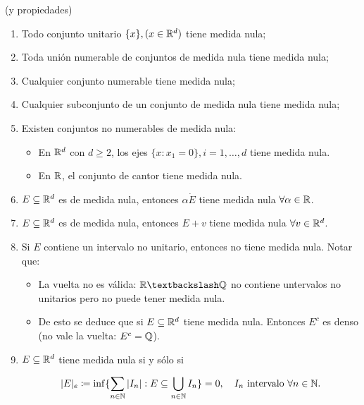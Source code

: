 	\begin{eg}
		(y propiedades)
		\begin{enumerate}
			\item Todo conjunto unitario $\{x\}, (x\in\mathbb{R}^d)$ tiene medida nula;

			\item Toda unión numerable de conjuntos de medida nula tiene medida nula;

			\item Cualquier conjunto numerable tiene medida nula;
			
			\item Cualquier subconjunto de un conjunto de medida nula tiene medida nula;

			\item Existen conjuntos no numerables de medida nula:

			\begin{itemize}
				\item En $\mathbb{R}^d$ con $d\geq 2$, los ejes $\{x:x_1=0\}, i=1,\dots,d$ tiene medida nula.

				\item En $\mathbb{R}$, el conjunto de cantor tiene medida nula.
			\end{itemize}

			\item $E\subseteq\mathbb{R}^d$ es de medida nula, entonces $\alpha\dot E$ tiene medida nula $\forall\alpha\in\mathbb{R}$.
			
			\item $E\subseteq\mathbb{R}^d$ es de medida nula, entonces $E + v$ tiene medida nula $\forall v\in\mathbb{R}^d$.

			\item Si $E$ contiene un intervalo no unitario, entonces no tiene medida nula. Notar que:

			\begin{itemize}
				\item La vuelta no es válida: $\R\textbackslash\Q$ no contiene untervalos no unitarios pero no puede tener medida nula.

				\item De esto se deduce que si $E\subseteq\mathbb{R}^d$ tiene medida nula. Entonces $E^c$ es denso (no vale la vuelta: $E^c=\mathbb{Q}$).
			\end{itemize}

			\item $E\subseteq\mathbb{R}^d$ tiene medida nula si y sólo si

			\[
			|E|_e\coloneq\inf \{ \sum_{n\in\mathbb{N}} |I_n| : E \subseteq \bigcup_{n\in\mathbb{N}} I_n \} = 0, \quad I_n \text{ intervalo } \forall n \in \mathbb{N}.
			\]
		\end{enumerate}
	\end{eg}
